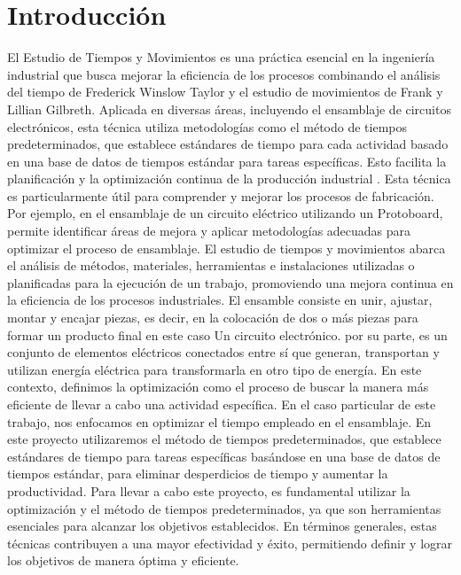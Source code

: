     \section{Introducción}
    El Estudio de Tiempos y Movimientos es una práctica esencial en la ingeniería industrial que busca mejorar la eficiencia de los procesos combinando el análisis del tiempo de Frederick Winslow Taylor y el estudio de movimientos de Frank y Lillian Gilbreth. Aplicada en diversas áreas, incluyendo el ensamblaje de circuitos electrónicos, esta técnica utiliza metodologías como el método de tiempos predeterminados, que establece estándares de tiempo para cada actividad basado en una base de datos de tiempos estándar para tareas específicas. Esto facilita la planificación y la optimización continua de la producción industrial \cite{Niebel}.
    Esta técnica es particularmente útil para comprender y mejorar los procesos de fabricación. Por ejemplo, en el ensamblaje de un circuito eléctrico utilizando un Protoboard, permite identificar áreas de mejora y aplicar metodologías adecuadas para optimizar el proceso de ensamblaje. El estudio de tiempos y movimientos abarca el análisis de métodos, materiales, herramientas e instalaciones utilizadas o planificadas para la ejecución de un trabajo, promoviendo una mejora continua en la eficiencia de los procesos industriales.
    El ensamble consiste en unir, ajustar, montar y encajar piezas, es decir, en la colocación de dos o más piezas para formar un producto final en este caso Un circuito electrónico.
    por su parte, es un conjunto de elementos eléctricos conectados entre sí que generan, transportan y utilizan energía eléctrica para transformarla en otro tipo de energía.
    En este contexto, definimos la optimización como el proceso de buscar la manera más eficiente de llevar a cabo una actividad específica. En el caso particular de este trabajo, nos enfocamos en optimizar el tiempo empleado en el ensamblaje. \cite{RAE}
    En este proyecto utilizaremos el método de tiempos predeterminados, que establece estándares de tiempo para tareas específicas basándose en una base de datos de tiempos estándar, para eliminar desperdicios de tiempo y aumentar la productividad.
    Para llevar a cabo este proyecto, es fundamental utilizar la optimización y el método de tiempos predeterminados, ya que son herramientas esenciales para alcanzar los objetivos establecidos. En términos generales, estas técnicas contribuyen a una mayor efectividad y éxito, permitiendo definir y lograr los objetivos de manera óptima y eficiente. \cite{Niebel}
    
